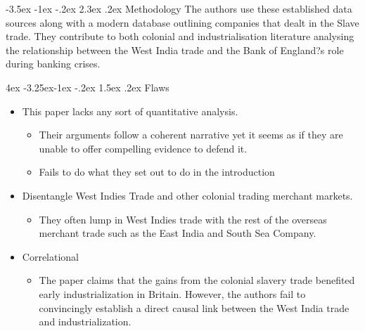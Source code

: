 \documentclass[]{article}
\makeatletter
\renewcommand\section{\leftskip 0pt\@startsection {section}{1}{\z@}%
	{-3.5ex \@plus -1ex \@minus -.2ex}%
	{2.3ex \@plus.2ex}%
	{\normalfont\Large\bfseries}}
\renewcommand\subsection{\leftskip 4ex\@startsection{subsection}{2}{\z@}%
	{-3.25ex\@plus -1ex \@minus -.2ex}%
	{1.5ex \@plus .2ex}%
	{\normalfont\large\bfseries}}
\makeatother
\begin{document}
\section{Methodology}
The authors use these established data sources along with a modern database outlining companies that dealt in the Slave trade. They contribute to both colonial and industrialisation literature analysing the relationship between the West India trade and the Bank of England?s role during banking crises.

\subsection{Flaws}
\begin{itemize}[leftmargin=10ex]
	\item This paper lacks any sort of quantitative analysis. 
	\begin{itemize}
		\item Their arguments follow a coherent narrative yet it seems as if they are unable to offer compelling evidence to defend it.
		\item Fails to do what they set out to do in the introduction
	\end{itemize}
	
	
	
	\item Disentangle West Indies Trade and other colonial trading merchant markets.
	\begin{itemize}
		\item They often lump in West Indies trade with the rest of the overseas merchant trade such as the East India and South Sea Company.
	\end{itemize}
	
	\item Correlational
	\begin{itemize}
		\item The paper claims that the gains from the colonial slavery trade benefited early industrialization in Britain. However, the authors fail to convincingly establish a direct causal link between the West India trade and industrialization. 
	\end{itemize}
	
\end{itemize}
\end{document}
